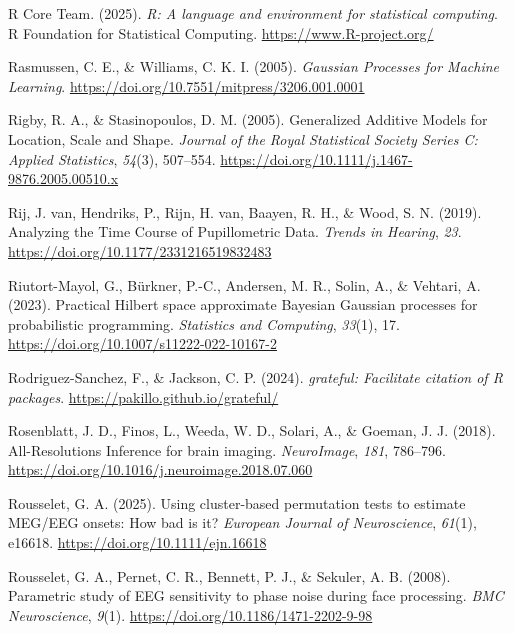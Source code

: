\documentclass[
  man,
  floatsintext,
  longtable,
  a4paper,
  nolmodern,
  notxfonts,
  notimes,
  colorlinks=true,linkcolor=blue,citecolor=blue,urlcolor=blue]{apa7}
\newlength{\cslhangindent}
\newenvironment{CSLReferences}[2] %
 {\begin{list}{}{%
  \setlength{\itemindent}{0pt}
  \setlength{\leftmargin}{0pt}
  \setlength{\parsep}{0pt}
  \ifodd #1
   \setlength{\leftmargin}{\cslhangindent}
   \setlength{\itemindent}{-1\cslhangindent}
  \fi
  \setlength{\itemsep}{#2\baselineskip}}}
 {\end{list}}
\begin{document}
\begin{CSLReferences}{1}{0}
R Core Team. (2025). \emph{{R}: A language and environment for
statistical computing}. R Foundation for Statistical Computing.
\url{https://www.R-project.org/}

Rasmussen, C. E., \& Williams, C. K. I. (2005). \emph{Gaussian Processes
for Machine Learning}.
\url{https://doi.org/10.7551/mitpress/3206.001.0001}

Rigby, R. A., \& Stasinopoulos, D. M. (2005). Generalized Additive
Models for Location, Scale and Shape. \emph{Journal of the Royal
Statistical Society Series C: Applied Statistics}, \emph{54}(3),
507--554. \url{https://doi.org/10.1111/j.1467-9876.2005.00510.x}

Rij, J. van, Hendriks, P., Rijn, H. van, Baayen, R. H., \& Wood, S. N.
(2019). Analyzing the Time Course of Pupillometric Data. \emph{Trends in
Hearing}, \emph{23}. \url{https://doi.org/10.1177/2331216519832483}

Riutort-Mayol, G., Bürkner, P.-C., Andersen, M. R., Solin, A., \&
Vehtari, A. (2023). Practical {Hilbert} space approximate {Bayesian
Gaussian} processes for probabilistic programming. \emph{Statistics and
Computing}, \emph{33}(1), 17.
\url{https://doi.org/10.1007/s11222-022-10167-2}

Rodriguez-Sanchez, F., \& Jackson, C. P. (2024). \emph{{grateful}:
Facilitate citation of {R} packages}.
\url{https://pakillo.github.io/grateful/}

Rosenblatt, J. D., Finos, L., Weeda, W. D., Solari, A., \& Goeman, J. J.
(2018). All-Resolutions Inference for brain imaging. \emph{NeuroImage},
\emph{181}, 786--796.
\url{https://doi.org/10.1016/j.neuroimage.2018.07.060}

Rousselet, G. A. (2025). Using cluster-based permutation tests to
estimate {MEG}/{EEG} onsets: {How} bad is it? \emph{European Journal of
Neuroscience}, \emph{61}(1), e16618.
\url{https://doi.org/10.1111/ejn.16618}

Rousselet, G. A., Pernet, C. R., Bennett, P. J., \& Sekuler, A. B.
(2008). Parametric study of EEG sensitivity to phase noise during face
processing. \emph{BMC Neuroscience}, \emph{9}(1).
\url{https://doi.org/10.1186/1471-2202-9-98}


\end{CSLReferences}
\end{document}
